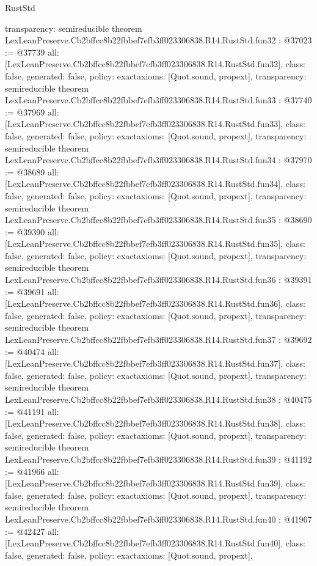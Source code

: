 \begin{lexlean}{RustStd}
\begin{coremodule}
{  transparency: semireducible
}
theorem LexLeanPreserve.Cb2bffcc8b22fbbef7efb3ff023306838.R14.RustStd.fun32 : @37023 := @37739 {
  all: [LexLeanPreserve.Cb2bffcc8b22fbbef7efb3ff023306838.R14.RustStd.fun32],
  class: false,
  generated: false,
  policy: exact{axioms: [Quot.sound, propext]},
  transparency: semireducible
}
theorem LexLeanPreserve.Cb2bffcc8b22fbbef7efb3ff023306838.R14.RustStd.fun33 : @37740 := @37969 {
  all: [LexLeanPreserve.Cb2bffcc8b22fbbef7efb3ff023306838.R14.RustStd.fun33],
  class: false,
  generated: false,
  policy: exact{axioms: [Quot.sound, propext]},
  transparency: semireducible
}
theorem LexLeanPreserve.Cb2bffcc8b22fbbef7efb3ff023306838.R14.RustStd.fun34 : @37970 := @38689 {
  all: [LexLeanPreserve.Cb2bffcc8b22fbbef7efb3ff023306838.R14.RustStd.fun34],
  class: false,
  generated: false,
  policy: exact{axioms: [Quot.sound, propext]},
  transparency: semireducible
}
theorem LexLeanPreserve.Cb2bffcc8b22fbbef7efb3ff023306838.R14.RustStd.fun35 : @38690 := @39390 {
  all: [LexLeanPreserve.Cb2bffcc8b22fbbef7efb3ff023306838.R14.RustStd.fun35],
  class: false,
  generated: false,
  policy: exact{axioms: [Quot.sound, propext]},
  transparency: semireducible
}
theorem LexLeanPreserve.Cb2bffcc8b22fbbef7efb3ff023306838.R14.RustStd.fun36 : @39391 := @39691 {
  all: [LexLeanPreserve.Cb2bffcc8b22fbbef7efb3ff023306838.R14.RustStd.fun36],
  class: false,
  generated: false,
  policy: exact{axioms: [Quot.sound, propext]},
  transparency: semireducible
}
theorem LexLeanPreserve.Cb2bffcc8b22fbbef7efb3ff023306838.R14.RustStd.fun37 : @39692 := @40474 {
  all: [LexLeanPreserve.Cb2bffcc8b22fbbef7efb3ff023306838.R14.RustStd.fun37],
  class: false,
  generated: false,
  policy: exact{axioms: [Quot.sound, propext]},
  transparency: semireducible
}
theorem LexLeanPreserve.Cb2bffcc8b22fbbef7efb3ff023306838.R14.RustStd.fun38 : @40475 := @41191 {
  all: [LexLeanPreserve.Cb2bffcc8b22fbbef7efb3ff023306838.R14.RustStd.fun38],
  class: false,
  generated: false,
  policy: exact{axioms: [Quot.sound, propext]},
  transparency: semireducible
}
theorem LexLeanPreserve.Cb2bffcc8b22fbbef7efb3ff023306838.R14.RustStd.fun39 : @41192 := @41966 {
  all: [LexLeanPreserve.Cb2bffcc8b22fbbef7efb3ff023306838.R14.RustStd.fun39],
  class: false,
  generated: false,
  policy: exact{axioms: [Quot.sound, propext]},
  transparency: semireducible
}
theorem LexLeanPreserve.Cb2bffcc8b22fbbef7efb3ff023306838.R14.RustStd.fun40 : @41967 := @42427 {
  all: [LexLeanPreserve.Cb2bffcc8b22fbbef7efb3ff023306838.R14.RustStd.fun40],
  class: false,
  generated: false,
  policy: exact{axioms: [Quot.sound, propext]},
}
\end{coremodule}
\end{lexlean}
